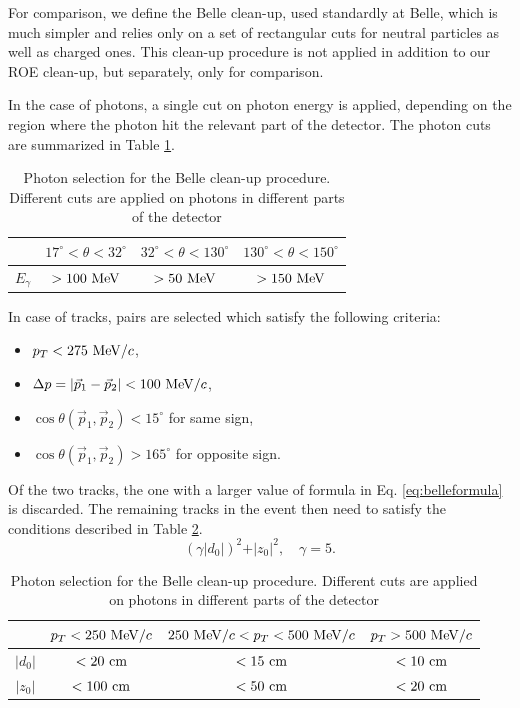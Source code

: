 For comparison, we define the Belle clean-up, used standardly at Belle, which is much simpler and relies only on a set of rectangular cuts for neutral particles as well as charged ones. This clean-up procedure is not applied in addition to our ROE clean-up, but separately, only for comparison. 

In the case of photons, a single cut on photon energy is applied, depending on the region where the photon hit the relevant part of the detector. The photon cuts are summarized in Table \ref{tab:bellegamma}.

\begin{table}[H]
	\centering
	\begin{tabular}{c|c|c|c}
		& $17^\circ < \theta < 32^\circ$ & $32^\circ < \theta < 130^\circ$ & $130^\circ < \theta < 150^\circ$ \\
		\toprule
		$E_\gamma$ & $> 100\mathrm{~MeV}$  & $> 50\mathrm{~MeV}$ & $> 150\mathrm{~MeV}$  \\
		\bottomrule
	\end{tabular}
	\captionsetup{width=.8\linewidth}
	\caption{Photon selection for the Belle clean-up procedure. Different cuts are applied on photons in different parts of the detector}
	\label{tab:bellegamma}
\end{table}

In case of tracks, pairs are selected which satisfy the following criteria:
\begin{itemize}
	\item $p_T < 275\mathrm{~MeV}/c$,
	\item $\Delta p = \vert \vec{p}_1 - \vec{p}_2\vert  < 100\mathrm{~MeV}/c$,
	\item $\cos \theta (\vec{p}_1,\vec{p}_2) < 15^\circ$ for same sign,
	\item $\cos\theta(\vec{p}_1,\vec{p}_2) > 165^\circ$ for opposite sign.
\end{itemize}

Of the two tracks, the one with a larger value of formula in Eq. \ref{eq:belleformula} is discarded. The remaining tracks in the event then need to satisfy the conditions described in Table \ref{tab:belletrack}.
\begin{equation}
\label{eq:belleformula}
\left(\gamma\vert d_0 \vert \right)^2 + \vert z_0 \vert^2, \quad \gamma = 5.
\end{equation}

\begin{table}[H]
	\centering
	\begin{tabular}{c|c|c|c}
		& $p_T < 250\mathrm{~MeV}/c$ & $250\mathrm{~MeV}/c < p_T < 500\mathrm{~MeV}/c$ & $p_T > 500\mathrm{~MeV}/c$ \\
		\toprule
		$\vert d_0 \vert$ & $< 20\mathrm{~cm}$  & $< 15\mathrm{~cm}$ & $< 10\mathrm{~cm}$  \\
		$\vert z_0 \vert$ & $< 100\mathrm{~cm}$  & $< 50\mathrm{~cm}$ & $< 20\mathrm{~cm}$  \\
		\bottomrule
		
	\end{tabular}
	\captionsetup{width=.8\linewidth}
	\caption{Photon selection for the Belle clean-up procedure. Different cuts are applied on photons in different parts of the detector}
	\label{tab:belletrack}
\end{table}

